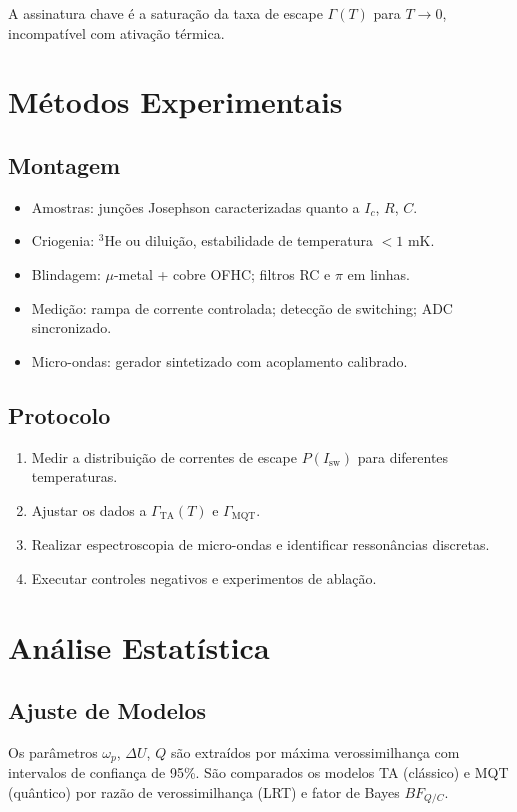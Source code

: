 \documentclass[aps,prb,reprint,showpacs,superscriptaddress,longbibliography]{revtex4-2}
\begin{document}
A assinatura chave é a saturação da taxa de escape $\Gamma(T)$ para $T \to 0$, incompatível com ativação térmica.

\section{Métodos Experimentais}

\subsection{Montagem}
\begin{itemize}
\item Amostras: junções Josephson caracterizadas quanto a $I_c$, $R$, $C$.
\item Criogenia: $^3$He ou diluição, estabilidade de temperatura $<1$ mK.
\item Blindagem: $\mu$-metal + cobre OFHC; filtros RC e $\pi$ em linhas.
\item Medição: rampa de corrente controlada; detecção de switching; ADC sincronizado.
\item Micro-ondas: gerador sintetizado com acoplamento calibrado.
\end{itemize}

\subsection{Protocolo}
\begin{enumerate}
\item Medir a distribuição de correntes de escape $P(I_\mathrm{sw})$ para diferentes temperaturas.
\item Ajustar os dados a $\Gamma_{\mathrm{TA}}(T)$ e $\Gamma_{\mathrm{MQT}}$.
\item Realizar espectroscopia de micro-ondas e identificar ressonâncias discretas.
\item Executar controles negativos e experimentos de ablação.
\end{enumerate}

\section{Análise Estatística}

\subsection{Ajuste de Modelos}
Os parâmetros $\omega_p$, $\Delta U$, $Q$ são extraídos por máxima verossimilhança com intervalos de confiança de 95\%. São comparados os modelos TA (clássico) e MQT (quântico) por razão de verossimilhança (LRT) e fator de Bayes $BF_{Q/C}$.
\end{document}
